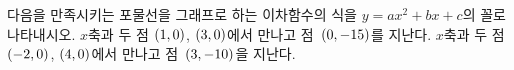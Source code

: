다음을 만족시키는 포물선을 그래프로 하는 이차함수의 식을 $y=ax^2+bx+c$의 꼴로 나타내시오.
 $x$축과 두 점 $(1{,}\mkern3mu\mathopen{}0)$, $(3{,}\mkern3mu\mathopen{}0)$에서 만나고 점~$(0{,}\mkern3mu\mathopen{}-15)$를 지난다.
 $x$축과 두 점 $(-2{,}\mkern3mu\mathopen{}0)$, $(4{,}\mkern3mu\mathopen{}0)$에서 만나고 점~$(3{,}\mkern3mu\mathopen{}-10)$을 지난다.
